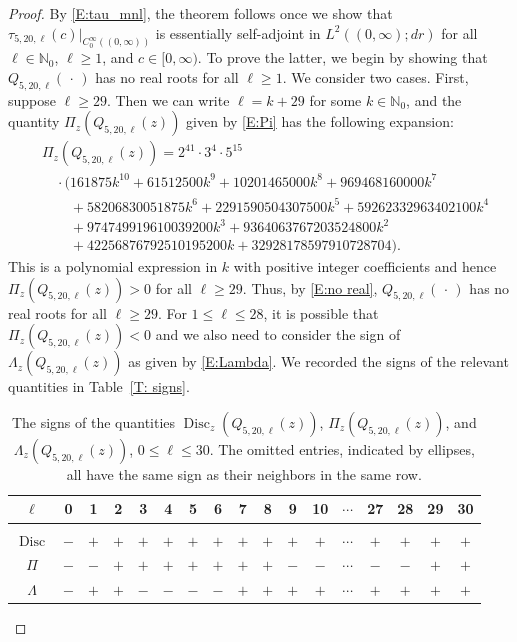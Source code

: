 \documentclass[reqno,11pt,centertags]{amsart}
\newcommand{\bbN}{{\mathbb{N}}}
\newcommand{\<}{\langle}
\renewcommand{\>}{\rangle}
\newcommand{\no}{\nonumber}
\newcommand{\dott}{\,\cdot\,}
\numberwithin{equation}{section}
\theoremstyle{definition}
\begin{document}
\begin{proof}
 By \eqref{E:tau_mnl}, the theorem follows once we show that  $\tau_{5,20,\ell}(c)\big|_{C_0^{\infty}((0,\infty))}$ is essentially self-adjoint in $L^2((0,\infty);dr)$ for all $\ell\in \bbN_0$, $\ell\geq 1$, and  $c\in [0,\infty)$. 
To prove the latter, we begin by showing that $Q_{5,20,\ell}(\dott)$ has no real roots for all $\ell\geq 1$. We consider two cases. First, suppose  $\ell \geq 29$.
Then we can write $\ell=k+29$ for some $k\in \bbN_0$, and the quantity $\Pi_z( Q_{5,20,\ell}(z))$ given by \eqref{E:Pi} has the following expansion:
%
\begin{align}
&\Pi_z( Q_{5,20,\ell}(z))=2^{41}\cdot 3^4 \cdot 5^{15}\\ \no
&\quad \cdot (161875 k^{10}+61512500 k^9+10201465000 k^8+969468160000 k^7\\ \no
&\quad\quad+58206830051875 k^6+2291590504307500  k^5+59262332963402100 k^4\\ \no
&\quad\quad+974749919610039200 k^3+9364063767203524800 k^2\\ \no
&\quad\quad+42256876792510195200k+32928178597910728704).\no
\end{align}
%
This is a polynomial expression in $k$ with positive integer coefficients and hence $\Pi_z( Q_{5,20,\ell}(z))>0$ for all $\ell \geq 29$.
Thus, by \eqref{E:no real},  $Q_{5,20,\ell}(\dott)$  has no real roots for all $\ell \geq 29$.
For $1\leq \ell \leq 28$, it is possible that $\Pi_z( Q_{5,20,\ell}(z))<0$ and we also need to consider the sign of  $\Lambda_z( Q_{5,20,\ell}(z))$ as given by \eqref{E:Lambda}.
We recorded the  signs of the relevant quantities  in Table~\ref{T: signs}.  
% 
\begin{table}[H]
 \begin{tabular}{c |cccccccccccccccc}
 $\ell$ & 0 & 1 &   2 &3 &4 &5&6& 7& 8& 9& 10& $\cdots$ & 27 & 28& 29& 30\\[2pt]
\hline
\\[-10 pt]
$\operatorname{Disc}$ & $-$ & $+$ & $+$ & $+$ & $+$ & $+$ & $+$ & $+$ &$+$ &$+$ &$+$ &$\cdots$&$+$ &$+$&$+$&$+$\\
$\Pi$ &$-$&$-$&$+$&$+$&$+$&$+$&$+$&$+$&$+$&$-$&$-$ &$\cdots$&$-$ &$-$&$+$&$+$ \\
$\Lambda$ &$-$&$+$&$+$&$-$&$-$&$-$&$-$&$+$&$+$&$+$&$+$&$\cdots$&$+$&$+$  &$+$&$+$
\end{tabular}
\caption{The signs of  the quantities $\operatorname{Disc}_z(Q_{5,20,\ell}(z))$, $\Pi_z(Q_{5,20,\ell}(z))$, and $\Lambda_z(Q_{5,20,\ell}(z))$, $0\leq \ell\leq 30$.
The omitted entries, indicated by ellipses, all have the same sign as their neighbors in the same row.}

\end{table}
\end{proof}
\end{document}
